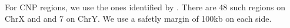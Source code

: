 \documentclass[10pt,a4paper]{article}
\newcommand{\GWSSix}{GWS6\xspace}
\newcommand{\citet}[1]{\cite{#1}}
\begin{document}
For CNP regions, we use the ones identified by \citet{RedonR_etal_2006}.  There are 48 such regions on ChrX and and 7 on ChrY.  We use a safetly margin of 100kb on each side.




\end{document}
